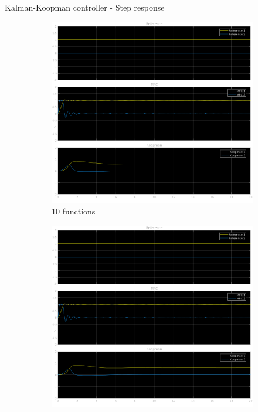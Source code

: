 \documentclass{beamer}
\begin{document}
\begin{frame}{Kalman-Koopman controller - Step response}
    \begin{figure}
        \centering
        \begin{subfigure}[b]{0.3\textwidth}
            \centering
            \includegraphics[width=\textwidth]{KK_10_Step.png}
            \caption{10 functions}
        \end{subfigure}
        \hfill
        \begin{subfigure}[b]{0.3\textwidth}
            \centering
            \includegraphics[width=\textwidth]{KK_20_Step.png}

\end{subfigure}
\end{figure}
\end{frame}
\end{document}

